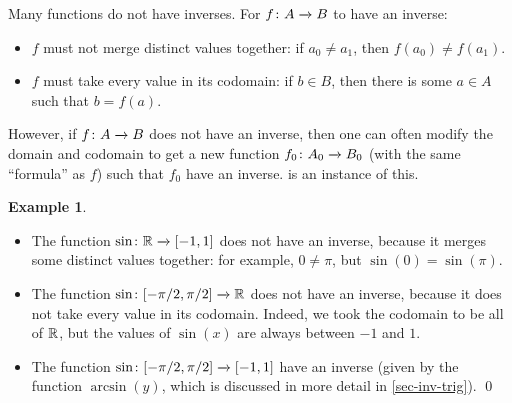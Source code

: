 \documentclass[a4paper]{book}
\theoremstyle{definition}
\newtheorem{example}[theorem]{Example}
\begin{document}
Many functions do not have inverses.  For $f\colon A\xrightarrow{}B$ to have an
inverse: 
\begin{itemize}
 \item $f$ must not merge distinct values together:
  if $a_0\neq a_1$, then $f(a_0)\neq f(a_1)$.
 \item $f$ must take every value in its codomain:
  if $b\in B$, then there is some $a\in A$ such that $b=f(a)$.
\end{itemize}
However, if $f\colon A\xrightarrow{}B$ does not have an inverse, then one can often
modify the domain and codomain to get a new function
$f_0\colon A_0\xrightarrow{}B_0$ (with the same ``formula'' as $f$) such that $f_0$
 have an inverse.   is an
instance of this.
\begin{example}
 \begin{itemize}
  \item The function $\sin\colon{\mathbb{R}}\xrightarrow{}[-1,1]$ does not have an inverse,
   because it merges some distinct values together: for example,
   $0\neq\pi$, but $\sin(0)=\sin(\pi)$.
  \item The function $\sin\colon[-\pi/2,\pi/2]\xrightarrow{}{\mathbb{R}}$ does not have an
   inverse, because it does not take every value in its codomain.
   Indeed, we took the codomain to be all of ${\mathbb{R}}$, but the values of
   $\sin(x)$ are always between $-1$ and $1$.
  \item The function $\sin\colon[-\pi/2,\pi/2]\xrightarrow{}[-1,1]$ 
   have an inverse (given by the function $\arcsin(y)$, which is
   discussed in more detail in \autoref{sec-inv-trig}). \qed
 \end{itemize}
\end{example}
\end{document}

